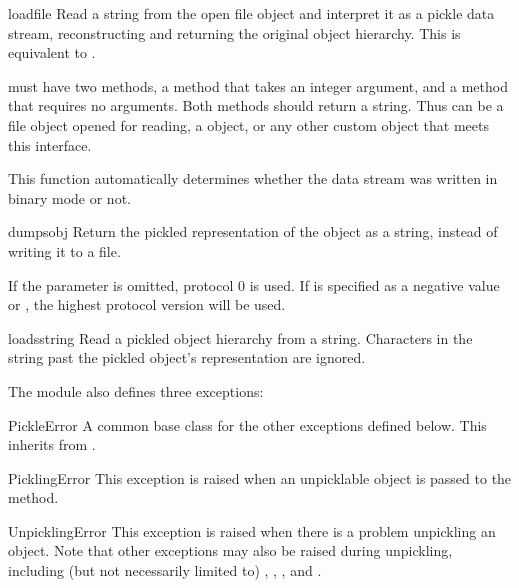 \begin{funcdesc}{load}{file}
Read a string from the open file object  and interpret it as
a pickle data stream, reconstructing and returning the original object
hierarchy.  This is equivalent to .

 must have two methods, a  method that takes
an integer argument, and a  method that requires no
arguments.  Both methods should return a string.  Thus  can
be a file object opened for reading, a
 object, or any other custom
object that meets this interface.

This function automatically determines whether the data stream was
written in binary mode or not.
\end{funcdesc}

\begin{funcdesc}{dumps}{obj}
Return the pickled representation of the object as a string, instead
of writing it to a file.

If the  parameter is omitted, protocol 0 is used.
If  is specified as a negative value
or ,
the highest protocol version will be used.


\end{funcdesc}

\begin{funcdesc}{loads}{string}
Read a pickled object hierarchy from a string.  Characters in the
string past the pickled object's representation are ignored.
\end{funcdesc}

The  module also defines three exceptions:

\begin{excdesc}{PickleError}
A common base class for the other exceptions defined below.  This
inherits from .
\end{excdesc}

\begin{excdesc}{PicklingError}
This exception is raised when an unpicklable object is passed to
the  method.
\end{excdesc}

\begin{excdesc}{UnpicklingError}
This exception is raised when there is a problem unpickling an object.
Note that other exceptions may also be raised during unpickling,
including (but not necessarily limited to) ,
, , and .
\end{excdesc}

